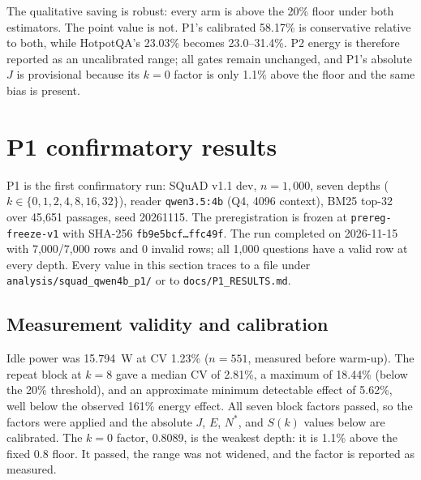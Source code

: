 The qualitative saving is robust: every arm is above the 20\% floor under both
estimators. The point value is not. P1's calibrated 58.17\% is conservative
relative to both, while HotpotQA's 23.03\% becomes 23.0--31.4\%. P2 energy is
therefore reported as an uncalibrated range; all gates remain unchanged, and
P1's absolute $J$ is provisional because its $k=0$ factor is only 1.1\% above
the floor and the same bias is present.

\section{P1 confirmatory results}\label{sec:s6}

P1 is the first confirmatory run: SQuAD v1.1 dev, $n=1{,}000$, seven depths
($k\in\{0,1,2,4,8,16,32\}$), reader \texttt{qwen3.5:4b} (Q4, 4096 context), BM25 top-32 over
45{,}651 passages, seed 20261115. The preregistration is frozen at \texttt{prereg-freeze-v1}
with SHA-256 \texttt{fb9e5bcf\ldots ffc49f}. The run completed on 2026-11-15 with 7{,}000/7{,}000
rows and 0 invalid rows; all 1{,}000 questions have a valid row at every depth. Every value in
this section traces to a file under \texttt{analysis/squad\_qwen4b\_p1/} or to
\texttt{docs/P1\_RESULTS.md}.

\subsection{Measurement validity and calibration}

Idle power was 15.794~W at CV 1.23\% ($n=551$, measured before warm-up). The repeat block at
$k=8$ gave a median CV of 2.81\%, a maximum of 18.44\% (below the 20\% threshold), and an
approximate minimum detectable effect of 5.62\%, well below the observed 161\% energy effect.
All seven block factors passed, so the factors were
applied and the absolute $J$, $E$, $N^{*}$, and $S(k)$ values below are calibrated. The $k=0$
factor, 0.8089, is the weakest depth: it is 1.1\% above the fixed 0.8 floor. It passed, the range
was not widened, and the factor is reported as measured.


